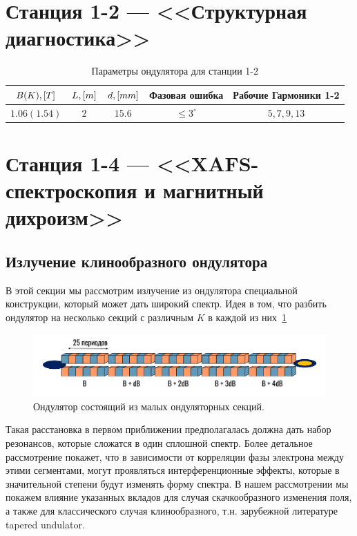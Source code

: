 \section{Станция 1-2 --- <<Структурная диагностика>>}

\begin{table}[h!]
	\centering
	\begin{tabular}{c|c|c|c|c}
		\hline\hline
		\rule{0pt}{3ex}$\mathnormal{B(K), [T]}$   & $\mathnormal{L, [m]}$ & $\mathnormal{d, [mm]}$ & Фазовая ошибка                & Рабочие Гармоники 1-2       \\ \hline
		\rule{0pt}{3ex}$1.06(1.54)$    			  & $2$                   & $15.6$      & $ \leq 3^{\circ}$& $5, 7, 9, 13$\\
		\hline\hline
	\end{tabular}
	\vspace{4pt} 
	\caption{Параметры ондулятора для станции 1-2}
	\label{table:und1-1}
\end{table}

\section{Станция 1-4 --- <<XAFS-спектроскопия и магнитный дихроизм>>}
\subsection{Излучение клинообразного ондулятора}
В этой секции мы рассмотрим излучение из ондулятора специальной конструкции, который может дать широкий спектр. Идея в том, что разбить ондулятор на несколько секций с различным $K$ в каждой из них~\ref{fig:section_und_sheme}
\begin{figure}[h]
	\centering  
	\includegraphics[width=\textwidth]{pic/und.pdf}
	\caption{Ондулятор состоящий из малых ондуляторных секций.}
	\label{fig:section_und_sheme}  
\end{figure}
Такая расстановка в первом приближении предполагалась должна дать набор резонансов, которые сложатся в один сплошной спектр. Более детальное рассмотрение покажет, что в зависимости от корреляции фазы электрона между этими сегментами, могут проявляться интерференционные эффекты, которые в значительной степени будут изменять форму спектра. В нашем рассмотрении мы покажем влияние указанных вкладов для случая скачкообразного изменения поля, а также для классического случая клинообразного, т.н. зарубежной литературе tapered undulator.

